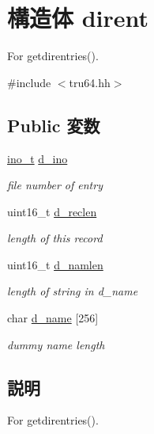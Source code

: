 \hypertarget{structTru64_1_1dirent}{
\section{構造体 dirent}
\label{structTru64_1_1dirent}
}


For getdirentries().  


{\ttfamily \#include $<$tru64.hh$>$}\subsection*{Public 変数}
\begin{DoxyCompactItemize}
\item 
\hyperlink{classTru64_aed4e918b44240739869c4bdb1c4787a9}{ino\_\-t} \hyperlink{structTru64_1_1dirent_a3fb8db68a229e05567ff4874104aed4b}{d\_\-ino}
\begin{DoxyCompactList}\small\item\em file number of entry \item\end{DoxyCompactList}\item 
uint16\_\-t \hyperlink{structTru64_1_1dirent_a14f5c4b79ce9b7772e5033ac64644c63}{d\_\-reclen}
\begin{DoxyCompactList}\small\item\em length of this record \item\end{DoxyCompactList}\item 
uint16\_\-t \hyperlink{structTru64_1_1dirent_aa87b10da682d903e5c780d7cfaa4ee82}{d\_\-namlen}
\begin{DoxyCompactList}\small\item\em length of string in d\_\-name \item\end{DoxyCompactList}\item 
char \hyperlink{structTru64_1_1dirent_a156ab9c5b093392ec66d64794aa91260}{d\_\-name} \mbox{[}256\mbox{]}
\begin{DoxyCompactList}\small\item\em dummy name length \item\end{DoxyCompactList}\end{DoxyCompactItemize}


\subsection{説明}
For getdirentries(). 

